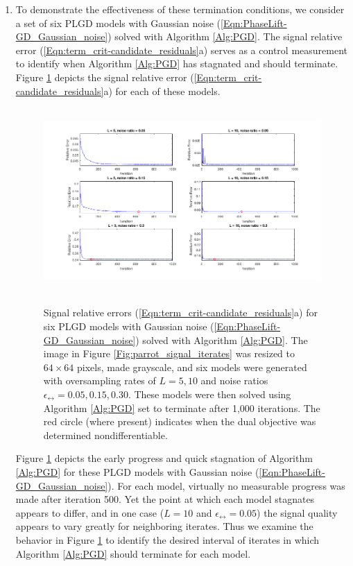 \begin{enumerate}
\item

To demonstrate the effectiveness of these termination conditions, we consider a set of six PLGD models with Gaussian noise (\ref{Eqn:PhaseLift-GD_Gaussian_noise}) solved with Algorithm \ref{Alg:PGD}.   The signal relative error (\ref{Eqn:term_crit-candidate_residuals}a) serves as a control measurement to identify when Algorithm \ref{Alg:PGD} has stagnated and should terminate.  Figure \ref{Fig:term_crit-signal_err} depicts the signal relative error (\ref{Eqn:term_crit-candidate_residuals}a) for each of these models.


\newpage

\begin{figure}[H]
\centering
\hbox{\hspace{-2.0cm} \includegraphics[scale=0.6]{term_crit-signal_err} }\vspace{-0.4cm}
\caption{Signal relative errors (\ref{Eqn:term_crit-candidate_residuals}a) for six PLGD models with Gaussian noise (\ref{Eqn:PhaseLift-GD_Gaussian_noise})  solved with Algorithm \ref{Alg:PGD}. The image in Figure \ref{Fig:parrot_signal_iterates} was resized to $64 \times 64$ pixels, made grayscale, and six models were generated with oversampling rates of $L = 5, 10$ and noise ratios $\epsilon_\rel = 0.05, 0.15, 0.30$.  These models were then solved using Algorithm \ref{Alg:PGD} set to terminate after 1,000 iterations.  The red circle (where present) indicates when the dual objective was determined nondifferentiable.}
\label{Fig:term_crit-signal_err}
\end{figure}

Figure \ref{Fig:term_crit-signal_err} depicts the early progress and quick stagnation of Algorithm \ref{Alg:PGD} for these PLGD models with Gaussian noise (\ref{Eqn:PhaseLift-GD_Gaussian_noise}).  For each model, virtually no measurable progress was made after iteration 500.  Yet the point at which each model stagnates appears to differ, and in one case ($L = 10$ and $\epsilon_\rel = 0.05$) the signal quality appears to vary greatly for neighboring iterates.  Thus we examine the behavior in Figure \ref{Fig:term_crit-signal_err} to identify the desired interval of iterates in which Algorithm \ref{Alg:PGD} should terminate for each model.





\end{enumerate}
